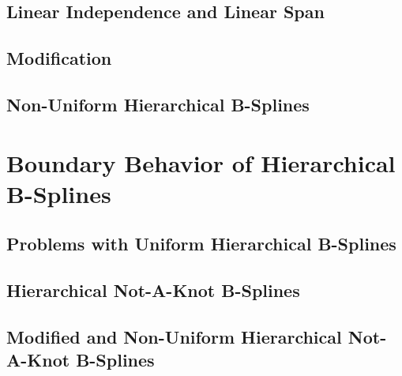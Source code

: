 
\subsection{Linear Independence and Linear Span}


\subsection{Modification}


\subsection{Non-Uniform Hierarchical B-Splines}


\section{Boundary Behavior of Hierarchical B-Splines}


\subsection{Problems with Uniform Hierarchical B-Splines}


\subsection{Hierarchical Not-A-Knot B-Splines}


\subsection{Modified and Non-Uniform Hierarchical Not-A-Knot B-Splines}


\cite{zenger91}

\blindmathpaper
